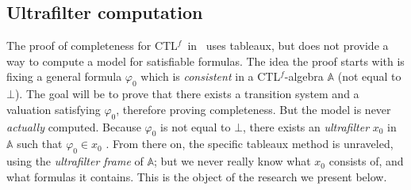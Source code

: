 \documentclass[11pt]{article}
\newcommand{\A}{{\mathbb{A}}}
\newcommand{\CTLf}{{CTL$^f$}}
\newcommand{\phii}{{\varphi}}
\theoremstyle{definition}
\begin{document}
\subsection*{Ultrafilter computation}

The proof of completeness for \CTLf~in~\cite[Section 3]{GhivG16} uses tableaux, but does not provide a way to compute a model for satisfiable formulas.
The idea the proof starts with is fixing a general formula $\phii_0$ which is \emph{consistent} in a \CTLf-algebra $\A$ (not equal to $\bot$).
The goal will be to prove that there exists a transition system  and a valuation satisfying $\phii_0$, therefore proving completeness. But 
the model is never \emph{actually} computed. Because $\phii_0$ is not equal to $\bot$, there exists an \emph{ultrafilter} $x_0$
in $\A$ such that $\phii_0 \in x_0$ \cite[Section 3.3]{GehvG22}. From there on, the specific tableaux method is unraveled, using the 
\emph{ultrafilter frame} of $\A$; but we never really know what $x_0$ consists of, and what formulas it contains. This 
is the object of the research we present below.
\end{document}
